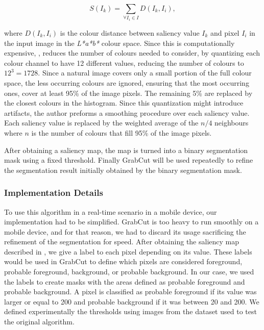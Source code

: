 \begin{equation}
S(I_{k}) = \sum_{\forall I_{i} \in I} D(I_{k}, I_{i}),
\end{equation}

where $D(I_{k}, I_{i})$ is the colour distance between saliency value $I_{k}$ and pixel $I_{i}$ in the input image in the \emph{L*a*b*} colour space. Since this is computationally expensive, \citeauthor{cheng2011global}, reduces the number of colours needed to consider, by quantizing each colour channel to have 12 different values, reducing the number of colours to $12^{3} = 1728$. Since a natural image covers only a small portion of the full colour space, the less occurring colours are ignored, ensuring that the most occurring ones, cover at least 95\% of the image pixels. The remaining 5\% are replaced by the closest colours in the histogram. Since this quantization might introduce artifacts, the author preforms a smoothing procedure over each saliency value. Each saliency value is replaced by the weighted average of the $n/4$ neighbours where $n$ is the number of colours that fill 95\% of the image pixels.

After obtaining a saliency map, the map is turned into a binary segmentation mask using a fixed threshold. Finally GrabCut \cite{rother2004grabcut} will be used repeatedly to refine the segmentation result initially obtained by the binary segmentation mask.

\subsubsection{Implementation Details}

To use this algorithm in a real-time scenario in a mobile device, our implementation had to be simplified. GrabCut is too heavy to run smoothly on a mobile device, and for that reason, we had to discard its usage sacrificing the refinement of the segmentation for speed. After obtaining the saliency map described in \cite{cheng2011global}, we give a label to each pixel depending on its value. These labels would be used in GrabCut to define which pixels are considered foreground, probable foreground, background, or probable background. In our case, we used the labels to create masks with the areas defined as probable foreground and probable background. A pixel is classified as probable foreground if its value was larger or equal to 200 and probable background if it was between 20 and 200. We defined experimentally the thresholds using images from the dataset used to test the original algorithm.

